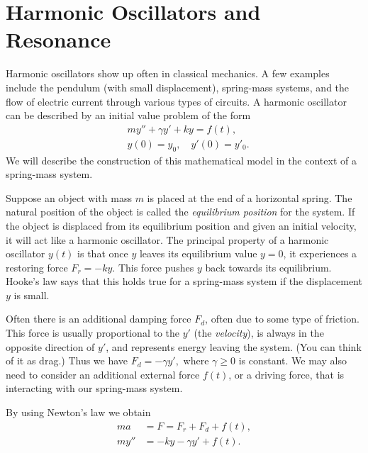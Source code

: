 
\section*{Harmonic Oscillators and Resonance} 
Harmonic oscillators show up often in classical mechanics.
A few examples include the pendulum (with small
 displacement), spring-mass systems, and the flow of electric current through various types of circuits.
A harmonic oscillator can be described by an initial value problem of the form
\begin{align*}
	&{}my'' + \gamma y' + ky = f(t) ,\\
	&{}y(0) = y_0,\quad
	y'(0) = y'_0.
\end{align*}
We will describe the construction of this mathematical model in the context of a spring-mass system.

Suppose an object with mass $m$ is placed at the end of a horizontal spring.
The natural position of the object is called the \textit{equilibrium position} for the system.
If the object is displaced from its equilibrium position and given an initial velocity,
it will act like a harmonic oscillator.
The principal property of a harmonic oscillator $y(t)$ is that once $y$ leaves its equilibrium value $y = 0$, it experiences a restoring force $F_r = -ky.$
This force pushes $y$ back towards its equilibrium.
Hooke's law says that this holds true for a
spring-mass system if the displacement $y$ is small.

Often there is an additional damping force $F_d$, often due to some type of friction. 
This force is usually proportional to the $y'$ (the \emph{velocity}), is always in the opposite direction of $y'$, and represents energy leaving the system. (You can think of it as drag.)
Thus we have $F_d = -\gamma y', $ where $ \gamma \geq 0$ is constant.
We may also need to consider an additional external force $f(t)$, or a driving force, that is interacting with our spring-mass system.

By using Newton's law we obtain
\begin{align*}
ma &= F = F_r + F_d + f(t),\\
my'' &= -ky -\gamma y' + f(t).
\end{align*}

